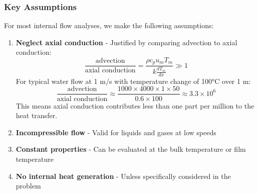 \subsubsection*{Key Assumptions}
For most internal flow analyses, we make the following assumptions:
%
\begin{enumerate}
    \item \textbf{Neglect axial conduction} - Justified by comparing advection to axial conduction:
   \[
   \frac{\text{advection}}{\text{axial conduction}} = \frac{\rho c_p u_m T_m}{k\frac{dT_m}{dx}} \gg 1
   \]
   For typical water flow at 1 m/s with temperature change of 100°C over 1 m:
   \[
   \frac{\text{advection}}{\text{axial conduction}} \approx \frac{1000 \times 4000 \times 1 \times 50}{0.6 \times 100} \approx 3.3 \times 10^6
   \]
   This means axial conduction contributes less than one part per million to the heat transfer.
    \item \textbf{Incompressible flow} - Valid for liquids and gases at low speeds
    \item \textbf{Constant properties} - Can be evaluated at the bulk temperature or film temperature
    \item \textbf{No internal heat generation} - Unless specifically considered in the problem
\end{enumerate}
%


